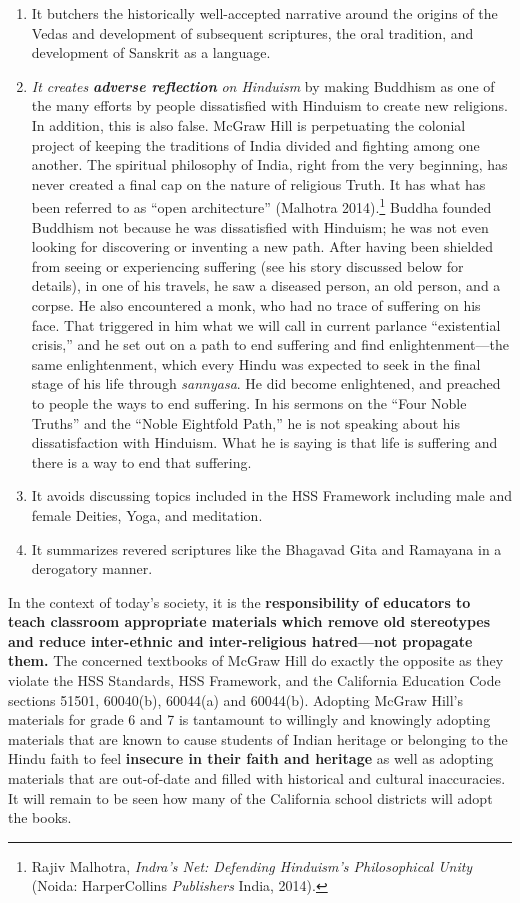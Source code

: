 \begin{enumerate}
\item It butchers the historically well-accepted narrative around the origins of the Vedas and development of subsequent scriptures, the oral tradition, and development of Sanskrit as a language. 

\item \textit{It creates} \textit{\textbf{adverse reflection}} \textit{ on Hinduism} by making Buddhism as one of the many efforts by people dissatisfied with Hinduism to create new religions. In addition, this is also false. McGraw Hill is perpetuating the colonial project of keeping the traditions of India divided and fighting among one another. The spiritual philosophy of India, right from the very beginning, has never created a final cap on the nature of religious Truth. It has what has been referred to as “open architecture” (Malhotra 2014).\footnote{Rajiv Malhotra, \textit{Indra’s Net: Defending Hinduism’s Philosophical Unity} (Noida: HarperCollins \textit{Publishers } India, 2014).} Buddha founded Buddhism not because he was dissatisfied with Hinduism; he was not even looking for discovering or inventing a new path. After having been shielded from seeing or experiencing suffering (see his story discussed below for details), in one of his travels, he saw a diseased person, an old person, and a corpse. He also encountered a monk, who had no trace of suffering on his face. That triggered in him what we will call in current parlance “existential crisis,” and he set out on a path to end suffering and find enlightenment—the same enlightenment, which every Hindu was expected to seek in the final stage of his life through \textit{sannyasa}. He did become enlightened, and preached to people the ways to end suffering. In his sermons on the “Four Noble Truths” and the “Noble Eightfold Path,” he is not speaking about his dissatisfaction with Hinduism. What he is saying is that life is suffering and there is a way to end that suffering. 

\item It avoids discussing topics included in the HSS Framework including male and female Deities, Yoga, and meditation.
\item It summarizes revered scriptures like the Bhagavad Gita and Ramayana in a derogatory manner.
\end{enumerate}
In the context of today’s society, it is the \textbf{responsibility of educators to teach classroom appropriate materials which remove old stereotypes and reduce inter-ethnic and inter-religious hatred—not propagate them.} The concerned textbooks of McGraw Hill do exactly the opposite as they violate the HSS Standards, HSS Framework, and the California Education Code sections 51501, 60040(b), 60044(a) and 60044(b). Adopting McGraw Hill’s materials for grade 6 and 7 is tantamount to willingly and knowingly adopting materials that are known to cause students of Indian heritage or belonging to the Hindu faith to feel \textbf{insecure in their faith and heritage} as well as adopting materials that are out-of-date and filled with historical and cultural inaccuracies. It will remain to be seen how many of the California school districts will adopt the books. 

